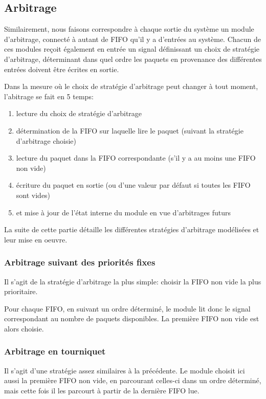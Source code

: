 \subsection{Arbitrage}
Similairement, nous faisons correspondre à chaque sortie du système un module
d'arbitrage, connecté à autant de FIFO qu'il y a d'entrées au système.
Chacun de ces modules reçoit également en entrée un signal définissant un choix
de stratégie d'arbitrage, déterminant dans quel ordre
les paquets en provenance des différentes entrées doivent être écrites en
sortie.


Dans la mesure où le choix de stratégie d'arbitrage peut changer à tout moment,
l'abitrage se fait en 5 temps:
\begin{enumerate}
\item lecture du choix de stratégie d'arbitrage
\item détermination de la FIFO sur laquelle lire le paquet (suivant la stratégie
d'arbitrage choisie)
\item lecture du paquet dans la FIFO correspondante (s'il y a au moins une FIFO
non vide)
\item écriture du paquet en sortie (ou d'une valeur par défaut si toutes les
FIFO sont vides)
\item et mise à jour de l'état interne du module en vue d'arbitrages futurs
\end{enumerate}
La suite de cette partie détaille les
différentes stratégies d'arbitrage modélisées et leur mise en oeuvre.

\subsubsection{Arbitrage suivant des priorités fixes}
Il s'agit de la stratégie d'arbitrage la plus simple: choisir la FIFO non vide la plus prioritaire.

Pour chaque FIFO, en suivant un ordre déterminé, le module lit donc le signal correspondant au nombre de paquets disponibles.
La première FIFO non vide est alors choisie.

\subsubsection{Arbitrage en tourniquet}
Il s'agit d'une stratégie assez similaires à la précédente.
Le module choisit ici aussi la première FIFO non vide, en parcourant celles-ci dans un ordre déterminé,
mais cette fois il les parcourt à partir de la dernière FIFO lue.

